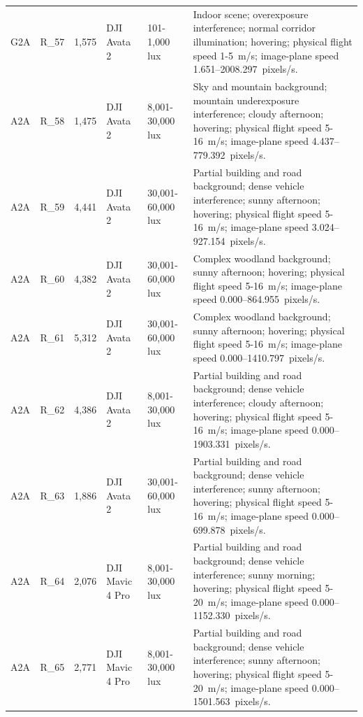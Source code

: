 \begin{longtable}{@{}C{0.045\textwidth} C{0.083\textwidth} C{0.075\textwidth} C{0.13\textwidth} C{0.15\textwidth} L{0.48\textwidth}@{}}
G2A & R\_57 & 1,575 & DJI Avata 2 & 101-1,000 lux & Indoor scene; overexposure interference; normal corridor illumination; hovering; physical flight speed 1-5~m/s; image-plane speed 1.651--2008.297~pixels/s. \\

A2A & R\_58 & 1,475 & DJI Avata 2 & 8,001-30,000 lux & Sky and mountain background; mountain underexposure interference; cloudy afternoon; hovering; physical flight speed 5-16~m/s; image-plane speed 4.437--779.392~pixels/s. \\

A2A & R\_59 & 4,441 & DJI Avata 2 & 30,001-60,000 lux & Partial building and road background; dense vehicle interference; sunny afternoon; hovering; physical flight speed 5-16~m/s; image-plane speed 3.024--927.154~pixels/s. \\

A2A & R\_60 & 4,382 & DJI Avata 2 & 30,001-60,000 lux & Complex woodland background; sunny afternoon; hovering; physical flight speed 5-16~m/s; image-plane speed 0.000--864.955~pixels/s. \\

A2A & R\_61 & 5,312 & DJI Avata 2 & 30,001-60,000 lux & Complex woodland background; sunny afternoon; hovering; physical flight speed 5-16~m/s; image-plane speed 0.000--1410.797~pixels/s. \\

A2A & R\_62 & 4,386 & DJI Avata 2 & 8,001-30,000 lux & Partial building and road background; dense vehicle interference; cloudy afternoon; hovering; physical flight speed 5-16~m/s; image-plane speed 0.000--1903.331~pixels/s. \\

A2A & R\_63 & 1,886 & DJI Avata 2 & 30,001-60,000 lux & Partial building and road background; dense vehicle interference; sunny afternoon; hovering; physical flight speed 5-16~m/s; image-plane speed 0.000--699.878~pixels/s. \\

A2A & R\_64 & 2,076 & DJI Mavic 4 Pro & 8,001-30,000 lux & Partial building and road background; dense vehicle interference; sunny morning; hovering; physical flight speed 5-20~m/s; image-plane speed 0.000--1152.330~pixels/s. \\

A2A & R\_65 & 2,771 & DJI Mavic 4 Pro & 8,001-30,000 lux & Partial building and road background; dense vehicle interference; sunny afternoon; hovering; physical flight speed 5-20~m/s; image-plane speed 0.000--1501.563~pixels/s. \\


\end{longtable}
